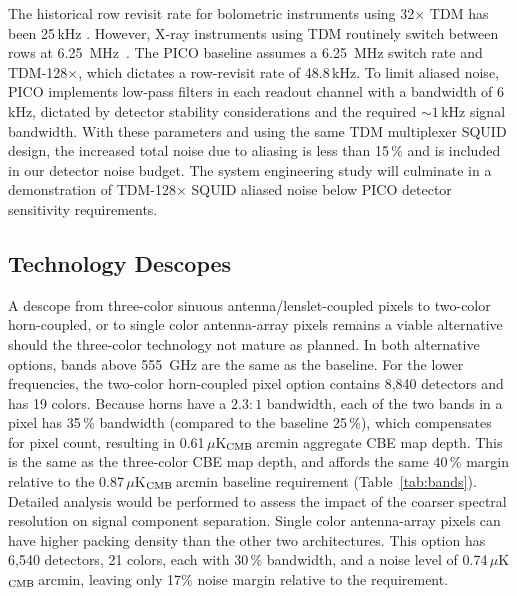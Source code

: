 The historical row revisit rate for bolometric instruments using 32$\times$ TDM has been 25\,kHz \cite[e.g.,][]{BICEP2015}. However, X-ray instruments using TDM routinely switch between rows at 6.25~MHz~\citep{Doriese2016}. The PICO baseline assumes a 6.25~MHz switch rate and TDM-128$\times$, which dictates a row-revisit rate %
of 48.8\,kHz. To limit aliased noise, PICO implements low-pass filters in each readout channel with a bandwidth of 6\,kHz, dictated by detector stability considerations and the required $\sim1$\,kHz signal bandwidth.  With these parameters and using the same TDM multiplexer SQUID design, the increased total noise due to aliasing is less than 15\,\% and is included in our detector noise budget.  The system engineering study will culminate in a demonstration of TDM-128$\times$ SQUID aliased noise below PICO detector sensitivity requirements.


\subsection{Technology Descopes}
\label{sec:technology_descopes} %

A descope from three-color sinuous antenna/lenslet-coupled pixels to two-color horn-coupled, or to single color antenna-array pixels remains a viable alternative should the three-color technology not mature as planned. In both alternative options, bands above 555~GHz are the same as the baseline. For the lower frequencies, the two-color horn-coupled pixel option contains 8,840 detectors and has 19 colors. Because horns have a $2.3:1$ bandwidth, each of the two bands in a pixel has 35\,\% bandwidth (compared to the baseline 25\,\%), which compensates for pixel count, resulting in 0.61\,$\mu$K$_{\rm CMB}$\,arcmin aggregate CBE map depth. This is the same as the three-color CBE map depth, and affords the same $40\,\%$ margin relative to the 0.87\,$\mu$K$_{\rm CMB}$\,arcmin baseline requirement (Table~\ref{tab:bands}). Detailed analysis would be performed to assess the impact of the coarser spectral resolution on signal component separation. Single color antenna-array pixels can have higher packing density than the other two architectures. This option has 6,540 detectors, 21 colors, each with 30\,\% bandwidth, and a noise level of 0.74\,$\mu$K$_{\rm CMB}$\,arcmin, leaving only 17\% noise margin relative to the requirement. 

